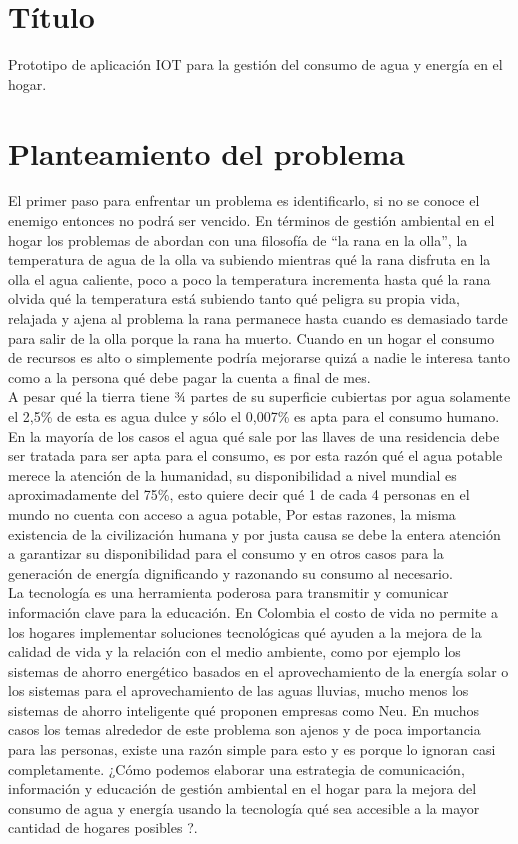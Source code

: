 \documentclass[a4paper,man,natbib]{apa6}
\begin{document}


\section{Título}
Prototipo de aplicación IOT para la gestión del consumo de agua y energía en el hogar.

\section{Planteamiento del problema}
El primer paso para enfrentar un problema es identificarlo, si no se conoce el enemigo entonces no podrá ser vencido. En términos de gestión ambiental en el hogar los problemas de abordan con una filosofía de “la rana en la olla”,  la temperatura de agua de la olla va subiendo mientras qué la rana disfruta en la olla el agua caliente, poco a poco la temperatura incrementa hasta qué la rana olvida qué la temperatura está subiendo tanto qué peligra su propia vida, relajada y ajena al problema la rana permanece hasta cuando es demasiado tarde para salir de la olla porque la rana ha muerto. Cuando en un hogar el consumo de recursos es alto o simplemente podría mejorarse quizá a nadie le interesa tanto como a la persona qué debe pagar la cuenta a final de mes.\\

A pesar qué la tierra tiene ¾ partes de su superficie cubiertas por agua solamente el 2,5\% de esta es agua dulce y sólo el 0,007\% es apta para el consumo humano. \cite{Aguaenel98:online} En la mayoría de los casos el agua qué sale por las llaves de una residencia debe ser tratada para ser apta para el consumo, es por esta razón qué el agua potable merece la atención de la humanidad, su disponibilidad a nivel mundial es aproximadamente del 75\%, \cite{Milesdem41:online} esto quiere decir qué 1 de cada 4 personas en el mundo no cuenta con acceso a agua potable,  Por estas razones, la misma existencia de la civilización humana y por justa causa se debe la entera atención a garantizar su disponibilidad para el consumo y en otros casos para la generación de energía dignificando y razonando su consumo al necesario.\\

La tecnología es una herramienta poderosa para transmitir y comunicar información clave para la educación. En Colombia el costo de vida no permite a los hogares implementar soluciones tecnológicas qué ayuden a la mejora de la calidad de vida y la relación con el medio ambiente, como por ejemplo los sistemas de ahorro energético basados en el aprovechamiento de la energía solar o los sistemas para el aprovechamiento de las aguas lluvias, mucho menos los sistemas de ahorro inteligente qué proponen empresas como Neu. En muchos casos los temas alrededor de este problema son ajenos y de poca importancia para las personas, existe una razón simple para esto y es porque lo ignoran casi completamente.  ¿Cómo podemos elaborar una estrategia de comunicación, información y educación de gestión ambiental en el hogar para la mejora del consumo de agua y energía usando la tecnología qué sea accesible a la mayor cantidad de hogares posibles ?.\\
\end{document}
